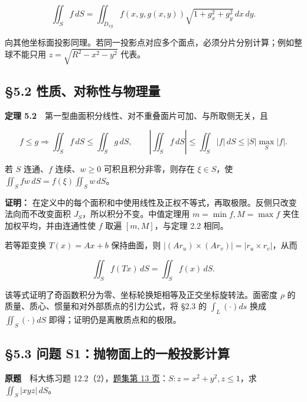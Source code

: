 \documentclass[11pt,a4paper]{article}
\begin{document}
\begin{equation*}
 \iint_Sf\,dS
 =\iint_{D_{xy}}f(x,y,g(x,y))\sqrt{1+g_x^2+g_y^2}\,dx\,dy.\tag{5.2}
\end{equation*}

向其他坐标面投影同理。若同一投影点对应多个面点，必须分片分别计算；例如整球不能只用
\(z=\sqrt{R^2-x^2-y^2}\) 代表。

\subsection{§5.2
性质、对称性与物理量}\label{ux6027ux8d28ux5bf9ux79f0ux6027ux4e0eux7269ux7406ux91cf}

\textbf{定理
5.2}　第一型曲面积分线性、对不重叠面片可加、与所取侧无关，且

\begin{equation*}
 f\le g\Longrightarrow\iint_Sf\,dS\le\iint_Sg\,dS,
 \qquad
 \left|\iint_Sf\,dS\right|\le\iint_S|f|\,dS\le |S|\max_S|f|.\tag{5.3}
\end{equation*}

若 \(S\) 连通、\(f\) 连续、\(w\ge0\) 可积且积分非零，则存在
\(\xi\in S\)，使 \(\iint_Sfw\,dS=f(\xi)\iint_Sw\,dS\)。

\textbf{证明：}
在定义中的每个面积和中使用线性及正权不等式，再取极限。反侧只改变法向而不改变面积
\(J_S\)，所以积分不变。中值定理用 \(m=\min f,M=\max f\)
夹住加权平均，并由连通性使 \(f\) 取遍 \([m,M]\)，与定理 2.2 相同。

若等距变换 \(T(x)=Ax+b\) 保持曲面，则
\(|(Ar_u)\times(Ar_v)|=|r_u\times r_v|\)，从而

\begin{equation*}
 \iint_Sf(Tx)\,dS=\iint_Sf(x)\,dS.\tag{5.4}
\end{equation*}

该等式证明了奇函数积分为零、坐标轮换矩相等及正交坐标旋转法。面密度
\(\rho\) 的质量、质心、惯量和对外部质点的引力公式，将 §2.3 的
\(\int_L(\cdot)ds\) 换成 \(\iint_S(\cdot)dS\)
即得；证明仍是离散质点和的极限。

\subsection{§5.3 问题
S1：抛物面上的一般投影计算}\label{ux95eeux9898-s1ux629bux7269ux9762ux4e0aux7684ux4e00ux822cux6295ux5f71ux8ba1ux7b97}

\textbf{原题}　科大练习题
12.2（2），\href{https://zj139.github.io/math-notes/files/problems/科大数分习题-v2\%282\%29.pdf\#page=13}{题集第
13 页}：\(S:z=x^2+y^2,z\le1\)，求 \(\iint_S|xyz|\,dS\)。
\end{document}
